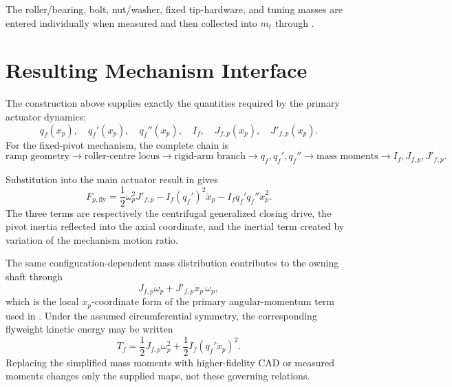 \documentclass[11pt]{report}
\numberwithin{equation}{section}
\begin{document}
The roller/bearing, bolt, nut/washer, fixed tip-hardware, and tuning masses are
entered individually when measured and then collected into \(m_t\) through
.

\section{Resulting Mechanism Interface}
\label{app:flyweight_interface}

The construction above supplies exactly the quantities required by the primary
actuator dynamics:
\begin{equation}
    \boxed{
    q_f(x_p),\quad
    q_f'(x_p),\quad
    q_f''(x_p),\quad
    I_f,\quad
    J_{f,p}(x_p),\quad
    J'_{f,p}(x_p).
    }
    \label{eq:appB_final_interface}
\end{equation}
For the fixed-pivot mechanism, the complete chain is
\begin{equation}
    \boxed{
    \text{ramp geometry}
    \rightarrow
    \text{roller-centre locus}
    \rightarrow
    \text{rigid-arm branch}
    \rightarrow
    q_f,q_f',q_f''
    \rightarrow
    \text{mass moments}
    \rightarrow
    I_f,J_{f,p},J'_{f,p}.
    }
    \label{eq:appB_complete_chain}
\end{equation}

Substitution into the main actuator result in
 gives
\begin{equation}
\boxed{
    F_{p,\mathrm{fly}}
    =
    \frac{1}{2}\omega_p^2J'_{f,p}
    -I_f(q_f')^2\ddot x_p
    -I_fq_f'q_f''\dot x_p^2.
}
    \label{eq:appB_flyweight_force_recap}
\end{equation}
The three terms are respectively the centrifugal generalized closing drive,
the pivot inertia reflected into the axial coordinate, and the inertial term
created by variation of the mechanism motion ratio.

The same configuration-dependent mass distribution contributes to the owning
shaft through
\begin{equation}
    \boxed{
    J_{f,p}\dot\omega_p
    +
    J'_{f,p}\dot x_p\,\omega_p,
    }
    \label{eq:appB_shaft_coupling_recap}
\end{equation}
which is the local \(x_p\)-coordinate form of the primary angular-momentum term
used in . Under the assumed
circumferential symmetry, the corresponding flyweight kinetic energy may be
written
\begin{equation}
    \boxed{
    T_f
    =
    \frac{1}{2}J_{f,p}\omega_p^2
    +
    \frac{1}{2}I_f(q_f'\dot x_p)^2.
    }
    \label{eq:appB_flyweight_kinetic_energy}
\end{equation}
Replacing the simplified mass moments with higher-fidelity CAD or measured
moments changes only the supplied maps, not these governing relations.
\end{document}
